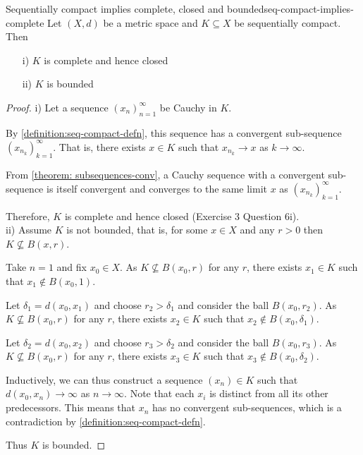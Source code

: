 \documentclass{article}
\numberwithin{equation}{section}
\numberwithin{figure}{section}
\begin{document}
\begin{theorem}{Sequentially compact implies complete, closed and bounded}{seq-compact-implies-complete}
    Let $(X,d)$ be a metric space and $K \subseteq X$ be sequentially compact. Then 
    \begin{itemize}
        \item[i)] $K$ is complete and hence closed
        \item[ii)] $K$ is bounded 
    \end{itemize}
    \begin{proof}
        i) Let a sequence $(x_n)^\infty_{n=1}$ be Cauchy in $K$.

            By \cref{definition:seq-compact-defn}, this sequence has a convergent sub-sequence $(x_{n_k})^\infty_{k=1}$. That is, there exists $x \in K$ such that $x_{n_k} \to x$ as $k \to \infty$.

            From \cref{theorem: subsequences-conv}, a Cauchy sequence with a convergent sub-sequence is itself convergent and converges to the same limit $x$ as $(x_{n_k})^\infty_{k=1}$.

            Therefore, $K$ is complete and hence closed (Exercise 3 Question 6i).
            \\
            
            ii) Assume $K$ is not bounded, that is, for some $x \in X$ and any $r > 0$ then $K \not\subseteq B(x,r)$.

            Take $n=1$ and fix $x_0 \in X$. As $K \not\subseteq B(x_0,r)$ for any $r$, there exists $x_1 \in K$ such that $x_1 \not\in B(x_0, 1)$.

            Let $\delta_1 = d(x_0,x_1)$ and choose $r_2>\delta_1$ and consider the ball $B(x_0,r_2)$. As $K \not\subseteq B(x_0,r)$ for any $r$, there exists $x_2 \in K$ such that $x_2 \not\in B(x_0, \delta_1)$.

            Let $\delta_2 = d(x_0,x_2)$ and choose $r_3>\delta_2$ and consider the ball $B(x_0,r_3)$. As $K \not\subseteq B(x_0,r)$ for any $r$, there exists $x_3 \in K$ such that $x_3 \not\in B(x_0, \delta_2)$.

            Inductively, we can thus construct a sequence $(x_n)\in K$ such that $d(x_0, x_n) \to \infty$ as $n\to \infty$. Note that each $x_i$ is distinct from all its other predecessors. This means that $x_n$ has no convergent sub-sequences, which is a contradiction by \cref{definition:seq-compact-defn}.

            Thus $K$ is bounded.
    \end{proof}
\end{theorem}
\end{document}
